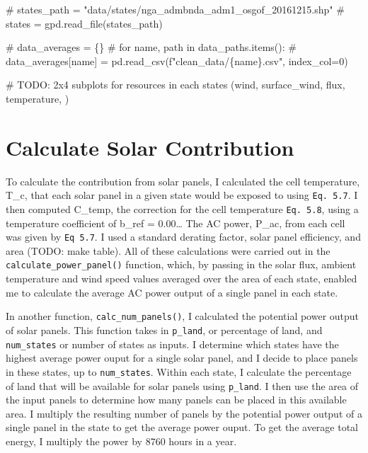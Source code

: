 \documentclass[
  letterpaper,
  DIV=11,
  numbers=noendperiod]{scrartcl}
\newenvironment{Shaded}{\begin{snugshade}}{\end{snugshade}}
\newcommand{\AlertTok}[1]{\textcolor[rgb]{0.68,0.00,0.00}{#1}}
\newcommand{\CommentTok}[1]{\textcolor[rgb]{0.37,0.37,0.37}{#1}}
\begin{document}
\begin{Shaded}
\begin{Highlighting}[]
\CommentTok{\# states\_path = "data/states/nga\_admbnda\_adm1\_osgof\_20161215.shp"}
\CommentTok{\# states = gpd.read\_file(states\_path)}

\CommentTok{\# data\_averages = \{\}}
\CommentTok{\# for name, path in data\_paths.items():}
\CommentTok{\#     data\_averages[name] = pd.read\_csv(f"clean\_data/\{name\}.csv", index\_col=0)}

\CommentTok{\# }\AlertTok{TODO}\CommentTok{: 2x4 subplots for resources in each states (wind, surface\_wind, flux, temperature, )}
\end{Highlighting}
\end{Shaded}

\hypertarget{calculate-solar-contribution}{%
\section{Calculate Solar
Contribution}\label{calculate-solar-contribution}}

To calculate the contribution from solar panels, I calculated the cell
temperature, T\_c, that each solar panel in a given state would be
exposed to using \texttt{Eq.\ 5.7}. I then computed C\_temp, the
correction for the cell temperature \texttt{Eq.\ 5.8}, using a
temperature coefficient of b\_ref = 0.00\ldots{} The AC power, P\_ac,
from each cell was given by \texttt{Eq\ 5.7}. I used a standard derating
factor, solar panel efficiency, and area (TODO: make table). All of
these calculations were carried out in the
\texttt{calculate\_power\_panel()} function, which, by passing in the
solar flux, ambient temperature and wind speed values averaged over the
area of each state, enabled me to calculate the average AC power output
of a single panel in each state.

In another function, \texttt{calc\_num\_panels()}, I calculated the
potential power output of solar panels. This function takes in
\texttt{p\_land}, or percentage of land, and \texttt{num\_states} or
number of states as inputs. I determine which states have the highest
average power ouput for a single solar panel, and I decide to place
panels in these states, up to \texttt{num\_states}. Within each state, I
calculate the percentage of land that will be available for solar panels
using \texttt{p\_land}. I then use the area of the input panels to
determine how many panels can be placed in this available area. I
multiply the resulting number of panels by the potential power output of
a single panel in the state to get the average power ouput. To get the
average total energy, I multiply the power by 8760 hours in a year.
\end{document}

